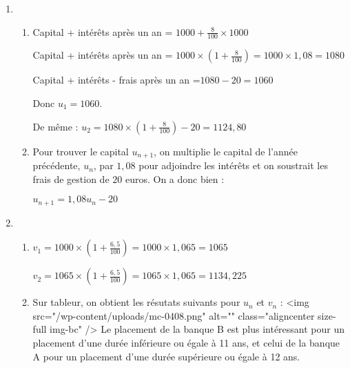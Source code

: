 \begin{corrige}
     \begin{enumerate}
          \item
          \begin{enumerate}
               \item
               Capital + intérêts après un an  = $1000 + \frac{8}{100}\times 1000$
               \par
               Capital + intérêts après un an  = $1000\times \left(1+\frac{8}{100}\right)=1000\times 1,08=1080$
               \par
               Capital + intérêts - frais après un an =$1080-20 = 1060$
               \par
               Donc $u_{1}=1060$.
               \par
               De même : $u_{2}=1080\times \left(1+\frac{8}{100}\right)-20 = 1124,80$
               \item
               Pour trouver le capital $u_{n+1}$, on multiplie le capital de l'année précédente, $u_{n}$, par $1,08$ pour adjoindre les intérêts et on soustrait les frais de gestion de $20$ euros. On a donc bien :
               \par
               $u_{n+1}=1,08u_{n}-20$
          \end{enumerate}
          \item
          \begin{enumerate}
               \item
               $v_{1}=1000\times \left(1+\frac{6,5}{100}\right)=1000\times 1,065=1065$
               \par
               $v_{2}=1065\times \left(1+\frac{6,5}{100}\right)=1065\times 1,065=1134,225$
               \item
               Sur tableur, on obtient les résutats suivants pour $u_{n}$ et $v_{n}$ :
               <img src="/wp-content/uploads/mc-0408.png" alt="" class="aligncenter size-full  img-bc" />
               Le placement de la banque B est plus intéressant pour un placement d'une durée inférieure ou égale à 11 ans, et celui de la banque A pour un placement d'une durée supérieure ou égale à 12 ans.
          \end{enumerate}
     \end{enumerate}
\end{corrige}


